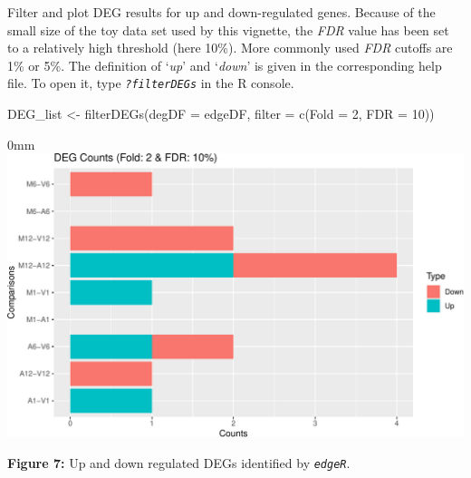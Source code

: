 \documentclass[14pt,]{article}
\newcommand{\hlnum}[1]{\textcolor[rgb]{0.816,0.125,0.439}{#1}}%
\newcommand{\hlstr}[1]{\textcolor[rgb]{0.251,0.627,0.251}{#1}}%
\newcommand{\hlcom}[1]{\textcolor[rgb]{0.502,0.502,0.502}{\textit{#1}}}%
\newcommand{\hlstd}[1]{\textcolor[rgb]{0.251,0.251,0.251}{#1}}%
\newenvironment{Shaded}{\begin{myshaded}}{\end{myshaded}}
\newcommand{\DecValTok}[1]{\hlnum{#1}}
\newcommand{\SpecialCharTok}[1]{\hlstr{#1}}
\newcommand{\DocumentationTok}[1]{\hlcom{#1}}
\newcommand{\OtherTok}[1]{{#1}}
\newcommand{\FunctionTok}[1]{\hlstd{#1}}
\newcommand{\AttributeTok}[1]{{#1}}
\newcommand{\NormalTok}[1]{\hlstd{#1}}
\begin{document}
Filter and plot DEG results for up and down-regulated genes. Because of the small size of the toy data set used by this vignette, the \emph{FDR} value has been set to a relatively high threshold (here 10\%). More commonly used \emph{FDR} cutoffs are 1\% or 5\%. The definition of `\emph{up}' and `\emph{down}' is given in the corresponding help file. To open it, type \emph{\texttt{?filterDEGs}} in the R console.

\begin{Shaded}
\begin{Highlighting}[]
\NormalTok{DEG\_list }\OtherTok{\textless{}{-}} \FunctionTok{filterDEGs}\NormalTok{(}\AttributeTok{degDF =}\NormalTok{ edgeDF, }\AttributeTok{filter =} \FunctionTok{c}\NormalTok{(}\AttributeTok{Fold =} \DecValTok{2}\NormalTok{, }\AttributeTok{FDR =} \DecValTok{10}\NormalTok{))}
\end{Highlighting}
\end{Shaded}

\begin{adjustwidth}{\fltoffset}{0mm}
\includegraphics[width=1\linewidth,]{systemPipeR_files/figure-latex/edger_deg_counts-1} \end{adjustwidth}

\textbf{Figure 7:} Up and down regulated DEGs identified by \emph{\texttt{edgeR}}.

\begin{Shaded}
\end{Shaded}
\end{document}
